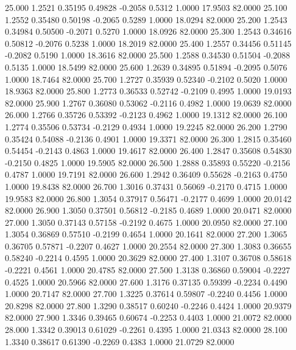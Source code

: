   25.000   1.2521   0.35195   0.49828  -0.2058   0.5312   1.0000  17.9503  82.0000
  25.100   1.2552   0.35480   0.50198  -0.2065   0.5289   1.0000  18.0294  82.0000
  25.200   1.2543   0.34984   0.50500  -0.2071   0.5270   1.0000  18.0926  82.0000
  25.300   1.2543   0.34616   0.50812  -0.2076   0.5238   1.0000  18.2019  82.0000
  25.400   1.2557   0.34456   0.51145  -0.2082   0.5190   1.0000  18.3616  82.0000
  25.500   1.2588   0.34530   0.51504  -0.2088   0.5135   1.0000  18.5499  82.0000
  25.600   1.2639   0.34895   0.51894  -0.2095   0.5076   1.0000  18.7464  82.0000
  25.700   1.2727   0.35939   0.52340  -0.2102   0.5020   1.0000  18.9363  82.0000
  25.800   1.2773   0.36533   0.52742  -0.2109   0.4995   1.0000  19.0193  82.0000
  25.900   1.2767   0.36080   0.53062  -0.2116   0.4982   1.0000  19.0639  82.0000
  26.000   1.2766   0.35726   0.53392  -0.2123   0.4962   1.0000  19.1312  82.0000
  26.100   1.2774   0.35506   0.53734  -0.2129   0.4934   1.0000  19.2245  82.0000
  26.200   1.2790   0.35424   0.54088  -0.2136   0.4901   1.0000  19.3371  82.0000
  26.300   1.2815   0.35460   0.54454  -0.2143   0.4863   1.0000  19.4617  82.0000
  26.400   1.2847   0.35608   0.54830  -0.2150   0.4825   1.0000  19.5905  82.0000
  26.500   1.2888   0.35893   0.55220  -0.2156   0.4787   1.0000  19.7191  82.0000
  26.600   1.2942   0.36409   0.55628  -0.2163   0.4750   1.0000  19.8438  82.0000
  26.700   1.3016   0.37431   0.56069  -0.2170   0.4715   1.0000  19.9583  82.0000
  26.800   1.3054   0.37917   0.56471  -0.2177   0.4699   1.0000  20.0142  82.0000
  26.900   1.3050   0.37501   0.56812  -0.2185   0.4689   1.0000  20.0471  82.0000
  27.000   1.3050   0.37143   0.57158  -0.2192   0.4675   1.0000  20.0950  82.0000
  27.100   1.3054   0.36869   0.57510  -0.2199   0.4654   1.0000  20.1641  82.0000
  27.200   1.3065   0.36705   0.57871  -0.2207   0.4627   1.0000  20.2554  82.0000
  27.300   1.3083   0.36655   0.58240  -0.2214   0.4595   1.0000  20.3629  82.0000
  27.400   1.3107   0.36708   0.58618  -0.2221   0.4561   1.0000  20.4785  82.0000
  27.500   1.3138   0.36860   0.59004  -0.2227   0.4525   1.0000  20.5966  82.0000
  27.600   1.3176   0.37135   0.59399  -0.2234   0.4490   1.0000  20.7147  82.0000
  27.700   1.3225   0.37614   0.59807  -0.2240   0.4456   1.0000  20.8298  82.0000
  27.800   1.3290   0.38517   0.60240  -0.2246   0.4424   1.0000  20.9379  82.0000
  27.900   1.3346   0.39465   0.60674  -0.2253   0.4403   1.0000  21.0072  82.0000
  28.000   1.3342   0.39013   0.61029  -0.2261   0.4395   1.0000  21.0343  82.0000
  28.100   1.3340   0.38617   0.61390  -0.2269   0.4383   1.0000  21.0729  82.0000
